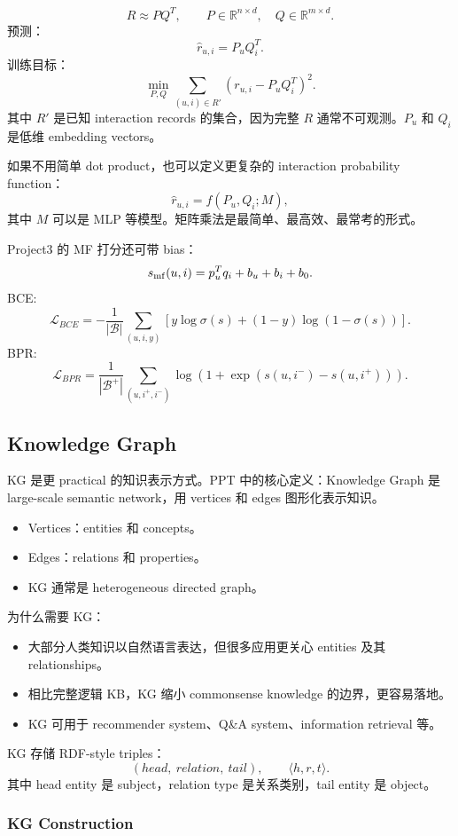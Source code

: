 \documentclass[UTF8,11pt,a4paper]{ctexart}
\begin{document}
\[
R\approx PQ^T,\qquad
P\in\mathbb{R}^{n\times d},\quad Q\in\mathbb{R}^{m\times d}.
\]
预测：
\[
\hat r_{u,i}=P_uQ_i^T.
\]
训练目标：
\[
\min_{P,Q}\sum_{(u,i)\in R'}(r_{u,i}-P_uQ_i^T)^2.
\]
其中 $R'$ 是已知 interaction records 的集合，因为完整 $R$ 通常不可观测。$P_u$ 和 $Q_i$ 是低维 embedding vectors。

如果不用简单 dot product，也可以定义更复杂的 interaction probability function：
\[
\hat r_{u,i}=f(P_u,Q_i;M),
\]
其中 $M$ 可以是 MLP 等模型。矩阵乘法是最简单、最高效、最常考的形式。

Project3 的 MF 打分还可带 bias：
\[
s_{\rm mf}(u,i)=p_u^Tq_i+b_u+b_i+b_0.
\]
BCE:
\[
\mathcal{L}_{BCE}=-\frac1{|\mathcal{B}|}\sum_{(u,i,y)}
\left[y\log\sigma(s)+(1-y)\log(1-\sigma(s))\right].
\]
BPR:
\[
\mathcal{L}_{BPR}=\frac1{|\mathcal{B}^+|}\sum_{(u,i^+,i^-)}
\log\left(1+\exp(s(u,i^-)-s(u,i^+))\right).
\]

\subsection{Knowledge Graph}

KG 是更 practical 的知识表示方式。PPT 中的核心定义：Knowledge Graph 是 large-scale semantic network，用 vertices 和 edges 图形化表示知识。
\begin{itemize}
\item Vertices：entities 和 concepts。
\item Edges：relations 和 properties。
\item KG 通常是 heterogeneous directed graph。
\end{itemize}

为什么需要 KG：
\begin{itemize}
\item 大部分人类知识以自然语言表达，但很多应用更关心 entities 及其 relationships。
\item 相比完整逻辑 KB，KG 缩小 commonsense knowledge 的边界，更容易落地。
\item KG 可用于 recommender system、Q\&A system、information retrieval 等。
\end{itemize}

KG 存储 RDF-style triples：
\[
(head,\ relation,\ tail),\qquad \langle h,r,t\rangle.
\]
其中 head entity 是 subject，relation type 是关系类别，tail entity 是 object。

\subsubsection{KG Construction}
\end{document}
